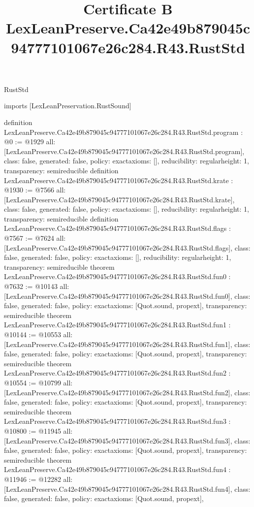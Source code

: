 \begin{lexlean}{RustStd}
\title{Certificate B LexLeanPreserve.Ca42e49b879045c94777101067e26c284.R43.RustStd}
\begin{coremodule}
imports [LexLeanPreservation.RustSound]

definition LexLeanPreserve.Ca42e49b879045c94777101067e26c284.R43.RustStd.program : @0 := @1929 {
  all: [LexLeanPreserve.Ca42e49b879045c94777101067e26c284.R43.RustStd.program],
  class: false,
  generated: false,
  policy: exact{axioms: []},
  reducibility: regular{height: 1},
  transparency: semireducible
}
definition LexLeanPreserve.Ca42e49b879045c94777101067e26c284.R43.RustStd.krate : @1930 := @7566 {
  all: [LexLeanPreserve.Ca42e49b879045c94777101067e26c284.R43.RustStd.krate],
  class: false,
  generated: false,
  policy: exact{axioms: []},
  reducibility: regular{height: 1},
  transparency: semireducible
}
definition LexLeanPreserve.Ca42e49b879045c94777101067e26c284.R43.RustStd.flags : @7567 := @7624 {
  all: [LexLeanPreserve.Ca42e49b879045c94777101067e26c284.R43.RustStd.flags],
  class: false,
  generated: false,
  policy: exact{axioms: []},
  reducibility: regular{height: 1},
  transparency: semireducible
}
theorem LexLeanPreserve.Ca42e49b879045c94777101067e26c284.R43.RustStd.fun0 : @7632 := @10143 {
  all: [LexLeanPreserve.Ca42e49b879045c94777101067e26c284.R43.RustStd.fun0],
  class: false,
  generated: false,
  policy: exact{axioms: [Quot.sound, propext]},
  transparency: semireducible
}
theorem LexLeanPreserve.Ca42e49b879045c94777101067e26c284.R43.RustStd.fun1 : @10144 := @10553 {
  all: [LexLeanPreserve.Ca42e49b879045c94777101067e26c284.R43.RustStd.fun1],
  class: false,
  generated: false,
  policy: exact{axioms: [Quot.sound, propext]},
  transparency: semireducible
}
theorem LexLeanPreserve.Ca42e49b879045c94777101067e26c284.R43.RustStd.fun2 : @10554 := @10799 {
  all: [LexLeanPreserve.Ca42e49b879045c94777101067e26c284.R43.RustStd.fun2],
  class: false,
  generated: false,
  policy: exact{axioms: [Quot.sound, propext]},
  transparency: semireducible
}
theorem LexLeanPreserve.Ca42e49b879045c94777101067e26c284.R43.RustStd.fun3 : @10800 := @11945 {
  all: [LexLeanPreserve.Ca42e49b879045c94777101067e26c284.R43.RustStd.fun3],
  class: false,
  generated: false,
  policy: exact{axioms: [Quot.sound, propext]},
  transparency: semireducible
}
theorem LexLeanPreserve.Ca42e49b879045c94777101067e26c284.R43.RustStd.fun4 : @11946 := @12282 {
  all: [LexLeanPreserve.Ca42e49b879045c94777101067e26c284.R43.RustStd.fun4],
  class: false,
  generated: false,
  policy: exact{axioms: [Quot.sound, propext]},
}
\end{coremodule}
\end{lexlean}
